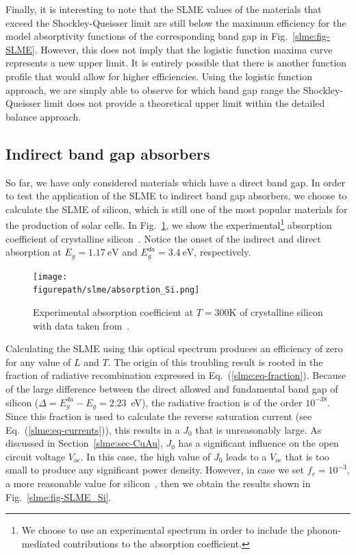 \begin{refsection}
Finally, it is interesting to note that the SLME values of the materials that 
exceed the Shockley-Queisser limit are still below the maximum efficiency for 
the model absorptivity functions of the corresponding band gap in 
Fig.~\ref{slme:fig-SLME}. However, this does not imply that the logistic 
function maxima curve represents a new upper limit. It is entirely possible 
that there is another function profile that would allow for higher 
efficiencies. Using the logistic function approach, we are simply able to 
observe for which band gap range the Shockley-Queisser limit does not provide 
a theoretical upper limit within the detailed balance approach. 
 
\subsection{Indirect band gap absorbers} 
 
So far, we have only considered materials which have a direct band gap. In 
order to test the application of the SLME to indirect band gap absorbers, we 
choose to calculate the SLME of silicon, which is still one of the most 
popular materials for the production of solar cells. In 
Fig.~\ref{slme:fig-Si_expAbs}, we show the experimental\footnote{We choose to 
use an experimental spectrum in order to include the phonon-mediated 
contributions to the absorption coefficient.} absorption coefficient of 
crystalline silicon~\cite{green2008}. Notice the onset of the indirect and 
direct absorption at \mbox{$E_g = 1.17~\si{\electronvolt}$} and 
\mbox{$E_g^{da} = 3.4~\si{\electronvolt}$}, respectively. 

\begin{figure}[ht] 
	\centering 
		\texttt{[image: \\figurepath/slme/absorption\_Si.png]} 
	\caption{Experimental absorption coefficient at $T = 300\si{\kelvin}$ of 
crystalline silicon with data taken from~\cite{green2008}.} 
	\label{slme:fig-Si_expAbs} 
\end{figure} 

Calculating the SLME using this optical spectrum produces an efficiency of 
zero for any value of $L$ and $T$. The origin of this troubling result is 
rooted in the fraction of radiative recombination expressed in 
Eq.~(\ref{slme:eq-fraction}). Because of the large difference between the 
direct allowed and fundamental band gap of silicon ($\Delta = 
E_g^{da}-E_g=2.23$~\si{\electronvolt}), the radiative fraction is of the order 
$10^{-38}$. Since this fraction is used to calculate the reverse saturation 
current (see Eq.~(\ref{slme:eq-currents})), this results in a $J_0$ that is 
unreasonably large. As discussed in Section~\ref{slme:sec-CuAu}, $J_0$ has a 
significant influence on the open circuit voltage $V_{oc}$. In this case, the 
high value of $J_0$ leads to a $V_{oc}$ that is too small to produce any 
significant power density. However, in case we set \mbox{$f_r = 10^{-3}$}, a 
more reasonable value for silicon~\cite{Shockley1952,Trupke2003,Richter2012}, 
then we obtain the results shown in Fig.~\ref{slme:fig-SLME_Si}. 
 

\end{refsection}
